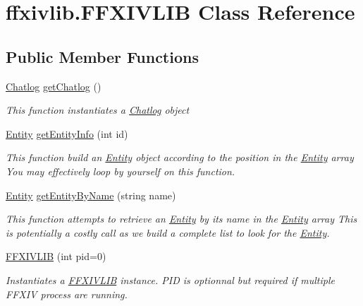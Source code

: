 \hypertarget{classffxivlib_1_1_f_f_x_i_v_l_i_b}{\section{ffxivlib.\-F\-F\-X\-I\-V\-L\-I\-B Class Reference}
\label{classffxivlib_1_1_f_f_x_i_v_l_i_b}
}
\subsection*{Public Member Functions}
\begin{DoxyCompactItemize}
\item 
\hyperlink{classffxivlib_1_1_chatlog}{Chatlog} \hyperlink{classffxivlib_1_1_f_f_x_i_v_l_i_b_acb5cc13e23647bd93e9f550a7a6961d3}{get\-Chatlog} ()
\begin{DoxyCompactList}\small\item\em This function instantiates a \hyperlink{classffxivlib_1_1_chatlog}{Chatlog} object \end{DoxyCompactList}\item 
\hyperlink{classffxivlib_1_1_entity}{Entity} \hyperlink{classffxivlib_1_1_f_f_x_i_v_l_i_b_a4632b29db89772dc247157184e99f684}{get\-Entity\-Info} (int id)
\begin{DoxyCompactList}\small\item\em This function build an \hyperlink{classffxivlib_1_1_entity}{Entity} object according to the position in the \hyperlink{classffxivlib_1_1_entity}{Entity} array You may effectively loop by yourself on this function. \end{DoxyCompactList}\item 
\hyperlink{classffxivlib_1_1_entity}{Entity} \hyperlink{classffxivlib_1_1_f_f_x_i_v_l_i_b_aeb451cfae304d94e04729c7ea5d26da6}{get\-Entity\-By\-Name} (string name)
\begin{DoxyCompactList}\small\item\em This function attempts to retrieve an \hyperlink{classffxivlib_1_1_entity}{Entity} by its name in the \hyperlink{classffxivlib_1_1_entity}{Entity} array This is potentially a costly call as we build a complete list to look for the \hyperlink{classffxivlib_1_1_entity}{Entity}. \end{DoxyCompactList}\item 
\hyperlink{classffxivlib_1_1_f_f_x_i_v_l_i_b_ac9deecbc7f2ceeac2b48b06620e8a665}{F\-F\-X\-I\-V\-L\-I\-B} (int pid=0)
\begin{DoxyCompactList}\small\item\em Instantiates a \hyperlink{classffxivlib_1_1_f_f_x_i_v_l_i_b}{F\-F\-X\-I\-V\-L\-I\-B} instance. P\-I\-D is optionnal but required if multiple F\-F\-X\-I\-V process are running. \end{DoxyCompactList}\item 

\end{DoxyCompactItemize}
